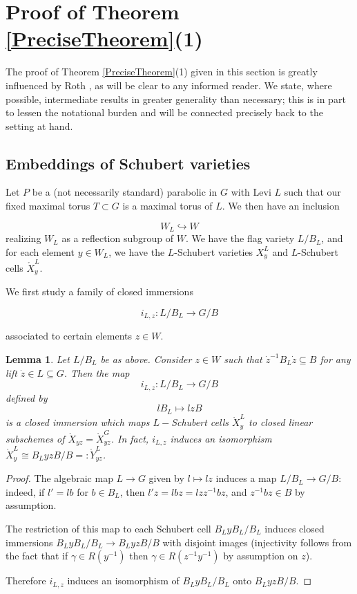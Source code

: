 \documentclass[12pt,reqno]{amsart}
\newtheorem{lemma}[theorem]{Lemma}
\theoremstyle{definition}
\begin{document}
\section{Proof of Theorem \ref{PreciseTheorem}(1)}

The proof of Theorem \ref{PreciseTheorem}(1) given in this section is greatly influenced by Roth \cite{Roth},  as will be clear to any informed reader. We state, where possible, intermediate results in greater generality than necessary; this is in part to lessen the notational burden and will be connected precisely back to the setting at hand. 




\subsection{Embeddings of Schubert varieties} Let $P$ be a (not necessarily standard) parabolic in $G$ with Levi $L$ such that our fixed maximal torus $T \subset G$ is a maximal torus of $L$. We then have an inclusion 

\[ W_L \hookrightarrow W\]
realizing $W_L$ as a reflection subgroup of $W$. We have the flag variety $L/B_L$, and for each element $y \in W_L$, we have the $L$-Schubert varieties $X^L_y$ and $L$-Schubert cells $\mathring{X}^L_y$. 

We first study a family of closed immersions 

\[i_{L,z}: L/B_L \rightarrow G/B\]

associated to certain elements $z \in W$.  



\begin{lemma}
	Let $L/B_L$ be as above. Consider $z \in W$ such that $\dot{z}^{-1}B_L \dot{z} \subseteq B$ for any lift $\dot{z} \in L \subseteq G$. Then the map \[i_{L,z}: L/B_L \rightarrow G/B\] defined by \[lB_L\mapsto lzB\] is a closed immersion which maps $L-$Schubert cells $\mathring{X}^L_y$ to closed linear subschemes of $\mathring{X}_{yz}=\mathring{X}^G_{yz}$. In fact, $i_{L,z}$ induces an isomorphism $\mathring{X}^L_y \cong B_L yz B/ B =: \mathring{Y}^L_{yz}$. 
\end{lemma}

\begin{proof}

The algebraic map $L\to G$ given by $l \mapsto lz$ induces a map $L/B_L \to G/B$: indeed, if $l' = lb$ for $b \in B_L$, then $l'z = lbz = lz z^{-1} b z$, and $z^{-1}bz \in B$ by assumption. 

The restriction of this map to each Schubert cell $B_L y B_L/B_L$ induces closed immersions $B_L y B_L/B_L \to B_L y z B/B$ with disjoint images (injectivity follows from the fact that if $\gamma  \in R(y^{-1})$ then $\gamma \in R(z^{-1}y^{-1})$ by assumption on $z$).

Therefore $i_{L,z}$ induces an isomorphism of $B_L y B_L/B_L$ onto $B_L y z B/B$. 
\end{proof}
\end{document}
